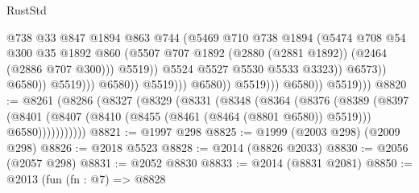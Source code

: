 \begin{lexlean}{RustStd}
\begin{coremodule}
                                                    @738
                                                    @33
                                                    @847
                                                    @1894
                                                    @863
                                                    @744
                                                    (@5469
                                                      @710
                                                      @738
                                                      @1894
                                                      (@5474
                                                        @708
                                                        @54
                                                        @300
                                                        @35
                                                        @1892
                                                        @860
                                                        (@5507
                                                          @707
                                                          @1892
                                                          (@2880 (@2881 @1892))
                                                          (@2464 (@2886 @707 @300)))
                                                        @5519))
                                                    @5524
                                                    @5527
                                                    @5530
                                                    @5533
                                                    @3323))
                                                @6573))
                                            @6580))
                                        @5519)))
                                  @6580))
                              @5519)))
                        @6580))
                    @5519)))
              @6580))
          @5519)))
@8820 := @8261
    (@8286
      (@8327
        (@8329
          (@8331
            (@8348
              (@8364
                (@8376
                  (@8389
                    (@8397
                      (@8401
                        (@8407 (@8410 (@8455 (@8461 (@8464 (@8801 @6580)) @5519))) @6580)))))))))))
@8821 := @1997 @298
@8825 := @1999 (@2003 @298) (@2009 @298)
@8826 := @2018 @5523
@8828 := @2014 (@8826 @2033)
@8830 := @2056 (@2057 @298)
@8831 := @2052 @8830
@8833 := @2014 (@8831 @2081)
@8850 := @2013
    (fun (fn : @7) =>
    @8828

\end{coremodule}
\end{lexlean}
